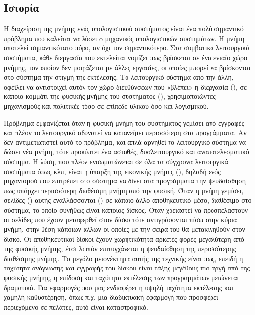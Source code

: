 \subsection{Ιστορία}

Η διαχείριση της μνήμης ενός υπολογιστικού συστήματος είναι ένα
πολύ σημαντικό πρόβλημα που καλείται να λύσει o μηχανικός
υπολογιστικών συστημάτων. Η μνήμη αποτελεί σημαντικότατο πόρο, αν όχι τον σημαντικότερο.
Στα συμβατικά λειτουργικά συστήματα, κάθε διεργασία που εκτελείται
νομίζει πως βρίσκεται σε ένα ενιαίο χώρο μνήμης, τον οποίον
δεν μοιράζεται με άλλες εργασίες, οι οποίες μπορεί να βρίσκονται
στο σύστημα την στιγμή της εκτέλεσης. Το λειτουργικό σύστημα
από την άλλη, οφείλει να αντιστοιχεί αυτόν τον χώρο διευθύνσεων
που «βλέπει» η διεργασία (), σε κάποιο κομμάτι της
φυσικής μνήμης του συστήματος (),
χρησιμοποιώντας μηχανισμούς και πολιτικές τόσο σε επίπεδο υλικού όσο και λογισμικού.
\newline

Πρόβλημα εμφανίζεται όταν η φυσική μνήμη του συστήματος γεμίσει
από εγγραφές και πλέον το λειτουργικό αδυνατεί να κατανείμει
περισσότερη στα προγράμματα. Αν δεν αντιμετωπιστεί αυτό το
πρόβλημα, και απλά αρνηθεί το λειτουργικό σύστημα να δώσει νέα
μνήμη, τότε προκύπτει ένα ασταθές, δυσλειτουργικό και
αναποτελεσματικό σύστημα. Η λύση, που πλέον ενσωματώνεται σε όλα
τα σύγχρονα λειτουργικά συστήματα όπως  κλπ, είναι
η ύπαρξη της εικονικής μνήμης (), δηλαδή ενός
μηχανισμού που επιτρέπει στο σύστημα να δίνει στα προγράμματα την ψευδαίσθηση
πως υπάρχει περισσότερη διαθέσιμη μνήμη από την φυσική. Όταν η
μνήμη γεμίσει, σελίδες () αυτής εναλλάσσονται ()
σε κάποιο άλλο αποθηκευτικό μέσο, διαθέσιμο στο σύστημα, το οποίο
συνήθως είναι κάποιος δίσκος. Όταν χρειαστεί να προσπελαστούν οι
σελίδες που έχουν μεταφερθεί στον δίσκο τότε αντιγράφονται πίσω
στην κύρια μνήμη, στην θέση κάποιων άλλων οι οποίες με την σειρά
του θα μετακινηθούν στον δίσκο. Οι αποθηκευτικοί δίσκοι έχουν
χωρητικότητα αρκετές φορές μεγαλύτερη από της φυσικής μνήμης,
έτσι λοιπόν επιτυγχάνεται η ψευδαίσθηση της περισσότερης
διαθέσιμης μνήμης\cite{wikiVirtMemory}. Το μεγάλο μειονέκτημα αυτής της τεχνικής
είναι πως, επειδή η ταχύτητα ανάγνωσης και εγγραφής του δίσκου
είναι τάξης μεγέθους πιο αργή από της φυσικής μνήμης, η επίδοση
και ταχύτητα εκτέλεσης των προγραμμάτων μειώνεται δραματικά. Για
εφαρμογές που μας ενδιαφέρει η υψηλή ταχύτητα εκτέλεσης και χαμηλή
 καθυστέρηση, όπως π.χ. μια διαδικτυακή εφαρμογή που προσφέρει
 περιεχόμενο σε πελάτες, αυτό είναι καταστροφικό.
\newline

